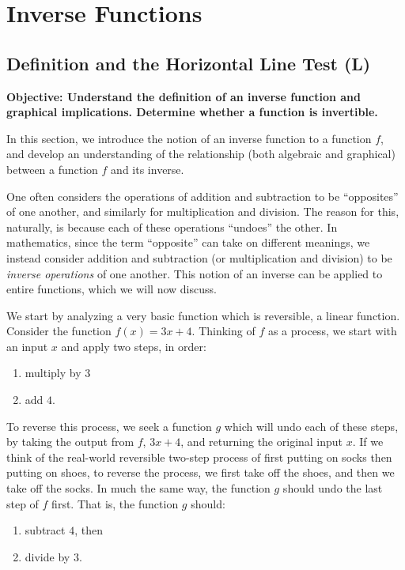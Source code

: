 \documentclass[12pt]{book}
\theoremstyle{definition}
\begin{document}
\section{Inverse Functions}
\subsection{Definition and the Horizontal Line Test (L)}
{\bf Objective: Understand the definition of an inverse function and graphical implications.  Determine whether a function is invertible.}\par
In this section, we introduce the notion of an inverse function to a function $f$, and develop an understanding of the relationship (both algebraic and graphical) between a function $f$ and its inverse.\par
One often considers the operations of addition and subtraction to be ``opposites'' of one another, and similarly for multiplication and division.  The reason for this, naturally, is because each of these operations ``undoes'' the other.  In mathematics, since the term ``opposite'' can take on different meanings, we instead consider addition and subtraction (or multiplication and division) to be {\it inverse operations} of one another.  This notion of an inverse can be applied to entire functions, which we will now discuss.\par
We start by analyzing a very basic function which is reversible, a linear function.  Consider the function $f(x) = 3x+4$.  Thinking of $f$ as a process, we start with an input $x$ and apply two steps, in order: 
\begin{enumerate}
	\item multiply by $3$ 
	\item add $4$. 
\end{enumerate}
To reverse this process, we seek a function $g$ which will undo each of these steps, by taking the output from $f$, $3x+4$, and returning the original input $x$.  If we think of the real-world reversible two-step process of first putting on socks then putting on shoes, to reverse the process, we first take off the shoes, and then we take off the socks.  In much the same way, the function $g$ should undo the last step of $f$ first.  That is, the function $g$ should:
\begin{enumerate}
	\item subtract  $4$, then 
	\item divide by $3$. 
\end{enumerate}
\end{document}
